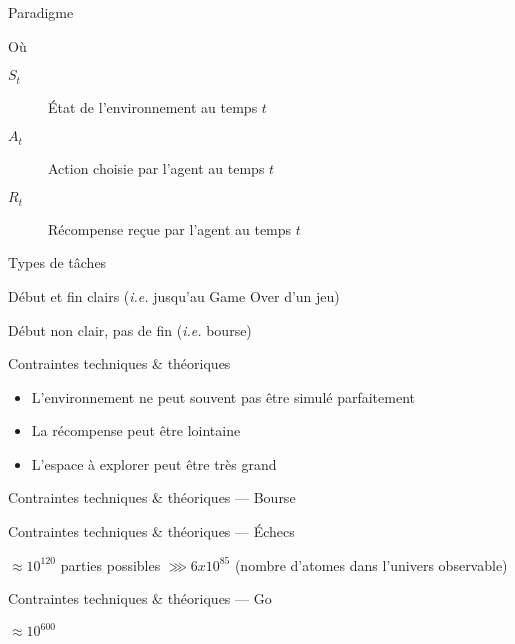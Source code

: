 \begin{frame}{Paradigme}

  Où

  \begin{description}
    \item[$S_t$] État de l'environnement au temps $t$
    \item[$A_t$] Action choisie par l'agent au temps $t$
    \item[$R_t$] Récompense reçue par l'agent au temps $t$
  \end{description}
\end{frame}

\begin{frame}{Types de tâches}
  \begin{description}[<+->]
    \item[Épisodique] Début et fin clairs (\textit{i.e.} jusqu'au Game Over d'un jeu)
    \item[Continue] Début non clair, pas de fin (\textit{i.e.} bourse)
  \end{description}
\end{frame}

\begin{frame}{Contraintes techniques \& théoriques}
  \begin{itemize}[<+->]
    \item L'environnement ne peut souvent pas être simulé parfaitement
    \item La récompense peut être lointaine
    \item L'espace à explorer peut être très grand
  \end{itemize}
\end{frame}

\begin{frame}{Contraintes techniques \& théoriques --- Bourse}
\end{frame}

\begin{frame}{Contraintes techniques \& théoriques --- Échecs}
  \pause
  \begin{center}
    $\approx 10^{120}$ parties possibles $\ggg 6 x 10^{85}$
    \newline
    (nombre d'atomes dans l'univers observable)
  \end{center}
\end{frame}

\begin{frame}{Contraintes techniques \& théoriques --- Go}
  \begin{center}
    \huge{$\approx 10^{600}$}
  \end{center}
\end{frame}
